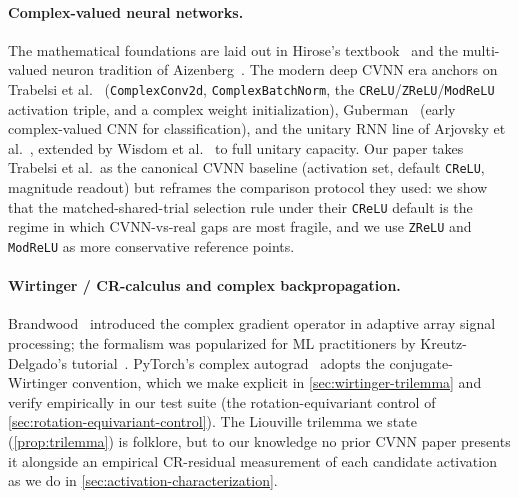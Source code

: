 \documentclass{article}
\providecommand{\Cref}[1]{\autoref{#1}}
\newcommand{\code}[1]{\texttt{#1}}
\begin{document}
\paragraph{Complex-valued neural networks.}
The mathematical foundations are laid out in Hirose's
textbook~\cite{hirose2012complex} and the multi-valued neuron
tradition of Aizenberg~\cite{aizenberg2011complex}. The modern deep
CVNN era anchors on Trabelsi et
al.~\cite{trabelsi2018deep} (\code{ComplexConv2d},
\code{ComplexBatchNorm}, the \code{CReLU}/\code{ZReLU}/\code{ModReLU}
activation triple, and a complex weight initialization),
Guberman~\cite{guberman2016complex} (early complex-valued CNN for
classification), and the unitary RNN line of
Arjovsky et al.~\cite{arjovsky2016unitary}, extended by Wisdom et
al.~\cite{wisdom2016fullcapacity} to full unitary capacity.
Our paper takes Trabelsi et al.\ as the canonical CVNN baseline
(activation set, default \code{CReLU}, magnitude readout) but reframes
the comparison protocol they used: we show that the matched-shared-trial
selection rule under their \code{CReLU} default is the regime in
which CVNN-vs-real gaps are most fragile, and we use \code{ZReLU} and
\code{ModReLU} as more conservative reference points.

\paragraph{Wirtinger / CR-calculus and complex backpropagation.}
Brandwood~\cite{brandwood1983complex} introduced the complex gradient
operator in adaptive array signal processing; the formalism was
popularized for ML practitioners by Kreutz-Delgado's
tutorial~\cite{kreutzdelgado2009complex}. PyTorch's complex
autograd~\cite{paszke2019pytorch} adopts the conjugate-Wirtinger
convention, which we make explicit in \Cref{sec:wirtinger-trilemma}
and verify empirically in our test suite (the rotation-equivariant
control of \Cref{sec:rotation-equivariant-control}). The Liouville
trilemma we state (\Cref{prop:trilemma}) is folklore, but to our
knowledge no prior CVNN paper presents it alongside an empirical
CR-residual measurement of each candidate activation as we do in
\Cref{sec:activation-characterization}.
\end{document}
